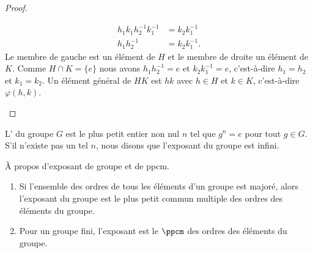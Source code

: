 \begin{proof}
\begin{subproof}
\begin{subproof}
\begin{subequations}
\begin{align}
					h_1k_1h_2^{-1}k_1^{-1} & =k_2k_1^{-1}  \\
					h_1h_2^{-1}            & =k_2k_1^{-1}.
				\end{align}
			\end{subequations}
			Le membre de gauche est un élément de \( H\) et le membre de droite un élément de \( K\). Comme \( H\cap K=\{ e \}\) nous avons \( h_1h_2^{-1}=e\) et \( k_2k_1^{-1}=e\), c'est-à-dire \( h_1=h_2\) et \( k_1=k_2\).
			\spitem[Surjectif]
			Un élément général de \( HK\) est \( hk\) avec \( h\in H\) et \( k\in K\), c'est-à-dire \( \varphi(h,k)\).
		\end{subproof}
	\end{subproof}
\end{proof}

\begin{definition}  \label{DefvtSAyb}
	L' du groupe \( G\) est le plus petit entier non nul \( n\) tel que \( g^n=e\) pour tout \( g\in G\). S'il n'existe pas un tel \( n\), nous disons que l'exposant du groupe est infini.
\end{definition}

\begin{proposition} \label{PROPooSWHHooOzqWkw}
	À propos d'exposant de groupe et de ppcm.
	\begin{enumerate}
		\item		\label{ITEMooFIPBooFOaPkU}
		      Si l'ensemble des ordres de tous les éléments d'un groupe est majoré, alors l'exposant du groupe est le plus petit commun multiple des ordres des éléments du groupe.
		\item		\label{ITEMooLIREooYEtcdL}
		      Pour un groupe fini, l'exposant est le \( \ppcm\) des ordres des éléments du groupe.
	\end{enumerate}
\end{proposition}

